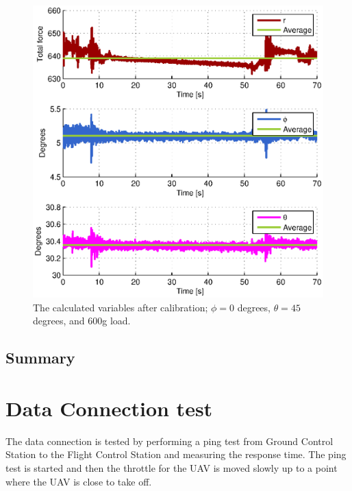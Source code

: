 \begin{figure}[hbtp]
\centering
\includegraphics[scale=1]{graphics/fcs_test/calib_result_compare_angles.eps}
\caption{The calculated variables after calibration; $\phi=0$ degrees, $\theta=45$ degrees, and 600g load.}
\label{fig:calib_result_compare_angles}
\end{figure}



\subsection{Summary}



\newpage
\section{Data Connection test}
The data connection is tested by performing a ping test from Ground Control Station to the Flight Control Station and measuring the response time. The ping test is started and then the throttle for the UAV is moved slowly up to a point where the UAV is close to take off.

